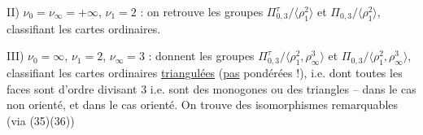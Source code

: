 II) $\nu_0=\nu_\infty=+\infty$, $\nu_1=2$ : on retrouve les groupes $\Pi_{0,3}^{\tau}/\langle\rho_1^2\rangle$ et $\Pi_{0,3}/\langle\rho_1^2\rangle$, classifiant les cartes ordinaires.

III) $\nu_0=\infty$, $\nu_1=2$, $\nu_\infty=3$ : donnent les groupes $\Pi_{0,3}^{\tau}/\langle\rho_1^2,\rho_\infty^3\rangle$ et $\Pi_{0,3}/\langle\rho_1^2,\rho_\infty^3\rangle$, classifiant les cartes ordinaires \uline{triangulées} (\uline{pas} pondérées !), i.e. dont toutes les faces sont  d'ordre divisant $3$ i.e. sont des monogones ou des triangles -- dans le cas non orienté, et dans le cas orienté. On trouve des isomorphismes remarquables (via (35)(36))


